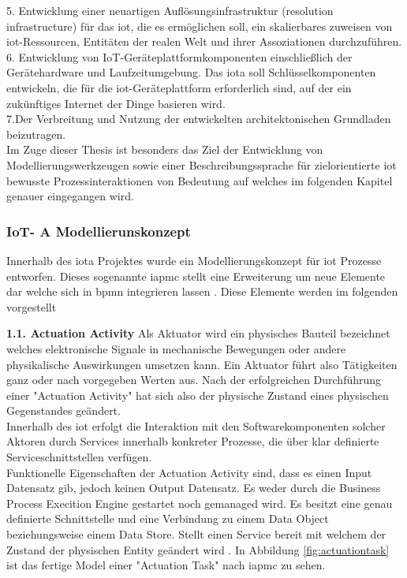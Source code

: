 \documentclass[a4paper, 12pt, twoside, headsepline=true]{scrartcl} %
\begin{document}
5. Entwicklung einer neuartigen Auflösungsinfrastruktur (resolution infrastructure) für das \ac{iot}, die es ermöglichen soll, ein skalierbares zuweisen von \ac{iot}-Ressourcen, Entitäten der realen Welt und ihrer Assoziationen durchzuführen.
\\

6. Entwicklung von IoT-Geräteplattformkomponenten einschließlich der Gerätehardware und Laufzeitumgebung. Das \ac{iota} soll Schlüsselkomponenten entwickeln, die für die \ac{iot}-Geräteplattform erforderlich sind, auf der ein zukünftiges Internet der Dinge basieren wird. 
\\

7.Der Verbreitung und Nutzung der entwickelten architektonischen Grundladen beizutragen.
\\

Im Zuge dieser Thesis ist besonders das Ziel der Entwicklung von Modellierungswerkzeugen sowie einer Beschreibungssprache für zielorientierte \ac{iot} bewusste Prozessinteraktionen von Bedeutung auf welches im folgenden Kapitel genauer eingegangen wird. 

\subsubsection{IoT- A Modellierunskonzept}
Innerhalb des \ac{iota} Projektes wurde ein Modellierungskonzept für \ac{iot} Prozesse entworfen. Dieses sogenannte \ac{iapmc} stellt eine Erweiterung um neue Elemente dar welche sich in \ac{bpmn} integrieren lassen  \cite{conceptsiotawarepm}. Diese Elemente werden im folgenden vorgestellt
\newline

\textbf{1.1. Actuation Activity}
\newline
Als Aktuator wird ein physisches Bauteil bezeichnet welches elektronische Signale in mechanische Bewegungen oder andere physikalische Auswirkungen umsetzen kann. Ein Aktuator führt also Tätigkeiten ganz oder nach vorgegeben Werten aus. Nach der erfolgreichen Durchführung einer "Actuation Activity" hat sich also der physische Zustand eines physischen Gegenstandes geändert.\\
Innerhalb des \ac{iot} erfolgt die Interaktion mit den Softwarekomponenten solcher Aktoren durch Services innerhalb konkreter Prozesse, die über klar definierte Serviceschnittstellen verfügen.\\
Funktionelle Eigenschaften der Actuation Activity sind, dass es einen Input Datensatz gib, jedoch keinen Output Datensatz. Es weder durch die Business Process Execition Engine gestartet noch gemanaged wird. Es besitzt eine genau definierte Schnittstelle und eine Verbindung zu einem Data Object beziehungsweise einem Data Store. Stellt einen Service bereit mit welchem der Zustand der physischen Entity geändert wird \cite[S.41]{conceptsiotawarepm}. In Abbildung \ref{fig:actuationtask} ist das fertige Model einer "Actuation Task" nach \ac{iapmc} zu sehen.
\end{document}
